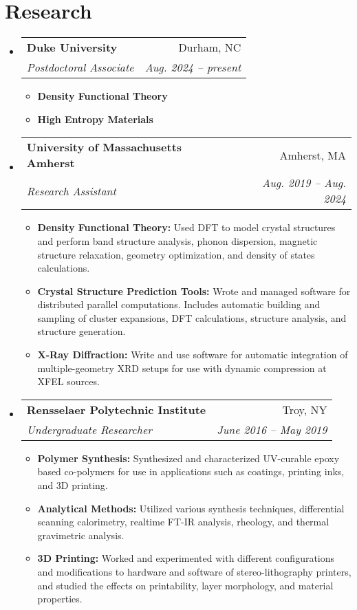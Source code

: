 \documentclass[letterpaper,11pt]{article}
\makeatletter
\newcommand{\positionItem}[4]{
    \vspace{-1pt}\item[]
    \begin{tabular*}{\textwidth}{l@{\extracolsep{\fill}}r}
        \textbf{#1} & #2 \\
        \textit{\footnotesize #3} & \textit{\footnotesize #4} \\
    \end{tabular*}\vspace{-8pt}
}
\newcommand{\positionSubItem}[2]{
    \scriptsize \item \textbf{#1} {#2 \vspace{-2pt}}
}
\makeatother
\begin{document}
\section{Research}

    \begin{itemize}[leftmargin=0pt]
        \positionItem
        {Duke University}{Durham, NC}
        {Postdoctoral Associate}{Aug. 2024 -- present}
        \begin{itemize}
            \positionSubItem{Density Functional Theory}{}
            \positionSubItem{High Entropy Materials}{}
        \end{itemize}
    \end{itemize}
    
    \begin{itemize}[leftmargin=0pt]
        \positionItem
        {University of Massachusetts Amherst}{Amherst, MA}
        {Research Assistant}{Aug. 2019 -- Aug. 2024}
        \begin{itemize}
            \positionSubItem{Density Functional Theory:}
                {Used DFT to model crystal structures and perform band structure analysis, phonon dispersion, magnetic structure relaxation, geometry optimization, and density of states calculations.}
            \positionSubItem{Crystal Structure Prediction Tools:}
                {Wrote and managed software for distributed parallel computations. Includes automatic building and sampling of cluster expansions, DFT calculations, structure analysis, and structure generation.}
            \positionSubItem{X-Ray Diffraction:}
                {Write and use software for automatic integration of multiple-geometry XRD setups for use with dynamic compression at XFEL sources.}
        \end{itemize}
    \end{itemize}
    
    \vspace{-10pt}
    
    \begin{itemize}[leftmargin=0pt]
        \positionItem
        {Rensselaer Polytechnic Institute}{Troy, NY}
        {Undergraduate Researcher}{June 2016 -- May 2019}
        \begin{itemize}
            \positionSubItem{Polymer Synthesis:}
                {Synthesized and characterized UV-curable epoxy based co-polymers for use in applications such as coatings, printing inks, and 3D printing.}
            \positionSubItem{Analytical Methods:}
                {Utilized various synthesis techniques, differential scanning calorimetry, realtime FT-IR analysis, rheology, and thermal gravimetric analysis.}
            \positionSubItem{3D Printing:}
                {Worked and experimented with different configurations and modifications to hardware and software of stereo-lithography printers, and studied the effects on printability, layer morphology, and material properties.}
        \end{itemize}
    \end{itemize}
\end{document}
